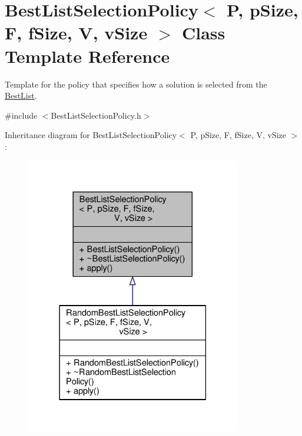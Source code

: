 \hypertarget{classBestListSelectionPolicy}{}\section{Best\+List\+Selection\+Policy$<$ P, p\+Size, F, f\+Size, V, v\+Size $>$ Class Template Reference}
\label{classBestListSelectionPolicy}


Template for the policy that specifies how a solution is selected from the \hyperlink{classBestList}{Best\+List}.  




{\ttfamily \#include $<$Best\+List\+Selection\+Policy.\+h$>$}



Inheritance diagram for Best\+List\+Selection\+Policy$<$ P, p\+Size, F, f\+Size, V, v\+Size $>$\+:\nopagebreak
\begin{figure}[H]
\begin{center}
\leavevmode
\includegraphics[width=266pt]{classBestListSelectionPolicy__inherit__graph}
\end{center}
\end{figure}


